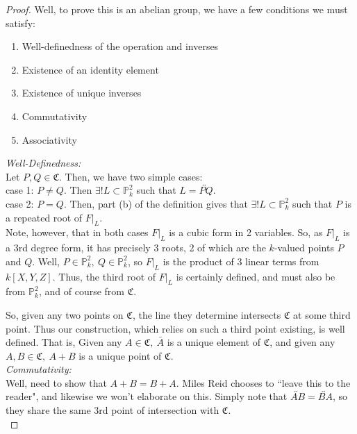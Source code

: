 \begin{proof}
Well, to prove this is an abelian group, we have a few conditions we must satisfy:
\begin{enumerate}
\item Well-definedness of the operation and inverses
\item Existence of an identity element
\item Existence of unique inverses
\item Commutativity
\item Associativity
\end{enumerate}

\emph{Well-Definedness:}\\
Let $P, Q \in \mathfrak{C}$. Then, we have two simple cases:\\

case 1:  $P \ne Q$. Then $\exists! L \subset \mathbb{P}^2_k$ such that $L = \overleftrightarrow{PQ}$.\\

case 2: $P = Q$. Then, part (b) of the definition gives that $\exists! L \subset \mathbb{P}^2_k$ such that
$P$ is a repeated root of $F|_L$.\\

Note, however, that in both cases $F|_L$ is a cubic form in 2 variables.
So, as $F|_L$ is a 3rd degree form, it has precisely 3 roots, 2 of which
are the $k$-valued points $P$ and $Q$. Well, $P \in \mathbb{P}^2_k,~Q\in \mathbb{P}^2_k$,
so $F|_L$ is the product of 3 linear terms from $k[X,Y,Z]$. Thus, the
third root of $F|_L$ is certainly defined, and must also be from $\mathbb{P}^2_k$, and of course from $\mathfrak{C}$.

So, given any two points on $\mathfrak{C}$, the line they determine intersects $\mathfrak{C}$ at some third point.
Thus our construction, which relies on such a third point existing, is well defined. That is,
Given any $A \in \mathfrak{C},~\bar{A}$ is a unique element of $\mathfrak{C}$, and given any $A, B \in \mathfrak{C},~A+B$ 
is a unique point of $\mathfrak{C}$.\\

\emph{Commutativity:}\\
Well, need to show that $A+B = B+A$. Miles Reid chooses to ``leave this to the reader", 
and likewise we won't elaborate on this. Simply note that $\overleftrightarrow{AB} = \overleftrightarrow{BA}$,
so they share the same 3rd point of intersection with $\mathfrak{C}$.\\


\end{proof}

